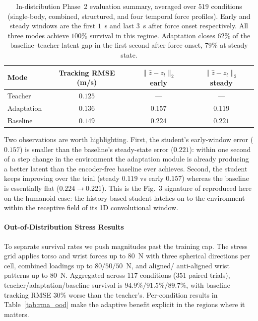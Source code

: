 \begin{table}[H]
\centering
\renewcommand{\arraystretch}{1.12}
\setlength{\tabcolsep}{8pt}
\begin{tabular}{lccc}
\toprule
\textbf{Mode} & \textbf{Tracking RMSE (m/s)}
              & $\|\hat z - z_t\|_2$ early
              & $\|\hat z - z_t\|_2$ steady \\
\midrule
Teacher    & $0.125$ & --- & --- \\
Adaptation & $0.136$ & $0.157$ & $0.119$ \\
Baseline   & $0.149$ & $0.224$ & $0.221$ \\
\bottomrule
\end{tabular}
\caption{In-distribution Phase~2 evaluation summary, averaged over $519$
conditions (single-body, combined, structured, and four temporal force
profiles). Early and steady windows are the first $1$~s and last $3$~s
after force onset respectively. All three modes achieve $100\%$ survival
in this regime. Adaptation closes $62\%$ of the baseline--teacher latent
gap in the first second after force onset, $79\%$ at steady state.}
\label{tab:rma_indist}
\end{table}

Two observations are worth highlighting. First, the student's early-window
error ($0.157$) is smaller than the baseline's steady-state error
($0.221$): within one second of a step change in the environment the
adaptation module is already producing a better latent than the encoder-free
baseline ever achieves. Second, the student keeps improving over the trial
(steady $0.119$ vs early $0.157$) whereas the baseline is essentially flat
($0.224\!\to\!0.221$). This is the Fig.~3 signature of
\citet{kumar2021rmarapidmotoradaptation} reproduced here on the humanoid
case: the history-based student latches on to the environment within the
receptive field of its 1D convolutional window.

\paragraph{Out-of-Distribution Stress Results}
\label{sec:rma_results_ood}
To separate survival rates we push magnitudes past the training cap. The
stress grid applies torso and wrist forces up to $80$~N with three spherical
directions per cell, combined loadings up to $80/50/50$~N, and aligned/
anti-aligned wrist patterns up to $80$~N. Aggregated across $117$ conditions
(351 paired trials), teacher/adaptation/baseline survival is
$94.9\%/91.5\%/89.7\%$, with baseline tracking RMSE $30\%$ worse than the
teacher's. Per-condition results in Table~\ref{tab:rma_ood} make the
adaptive benefit explicit in the regions where it matters.

